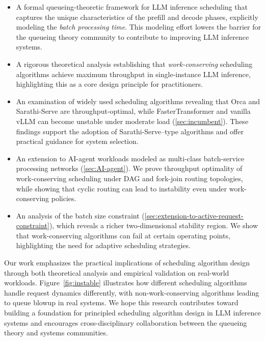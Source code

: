 \documentclass[11pt]{article}
\theoremstyle{plain}
\theoremstyle{definition}
\theoremstyle{remark}
\begin{document}
\begin{itemize}
  \item A formal queueing-theoretic framework for LLM inference scheduling that captures the unique characteristics of the prefill and decode phases, explicitly modeling the \textit{batch processing time}. This modeling effort lowers the barrier for the queueing theory community to contribute to improving LLM inference systems.

  \item A rigorous theoretical analysis establishing that \textit{work-conserving} scheduling algorithms achieve maximum throughput in single-instance LLM inference, highlighting this as a core design principle for practitioners. 

  \item An examination of widely used scheduling algorithms revealing that Orca and Sarathi-Serve are throughput-optimal, while FasterTransformer and vanilla vLLM can become unstable under moderate load (\cref{sec:incumbent}). These findings support the adoption of Sarathi-Serve--type algorithms and offer practical guidance for system selection.

  \item An extension to AI-agent workloads modeled as multi-class batch-service processing networks (\cref{sec:AI-agent}). We prove throughput optimality of work-conserving scheduling under DAG and fork-join routing topologies, while showing that cyclic routing can lead to instability even under work-conserving policies.

  \item An analysis of the batch size constraint (\cref{sec:extension-to-active-request-constraint}), which reveals a richer two-dimensional stability region. We show that work-conserving algorithms can fail at certain operating points, highlighting the need for adaptive scheduling strategies.
\end{itemize}
Our work emphasizes the practical implications of scheduling algorithm design through both theoretical analysis and empirical validation on real-world workloads. Figure~\ref{fig:instable} illustrates how different scheduling algorithms handle request dynamics differently, with non-work-conserving algorithms leading to queue blowup in real systems. We hope this research contributes toward building a foundation for principled scheduling algorithm design in LLM inference systems and encourages cross-disciplinary collaboration between the queueing theory and systems communities.
    
\end{document}

